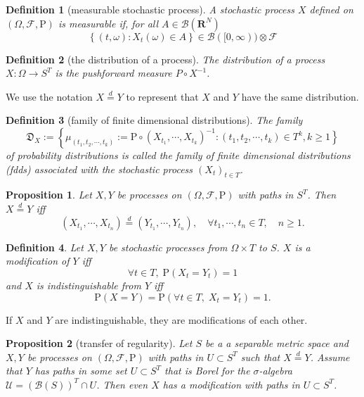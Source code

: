 \documentclass{report}
\newtheorem{definition}{Definition}[section]
\newtheorem{proposition}{Proposition}[section]
\theoremstyle{nonumberplain}
\begin{document}
\begin{definition}[measurable stochastic process]
	A stochastic process $X$ defined on $(\Omega ,{\mathcal{F}},\mathrm{P})$ is measurable if, for all $A \in \mathcal{B}\left(\mathbf{R}^{N}\right)$
	\[
	\left\{(t, \omega): X_{t}(\omega) \in A\right\} \in \mathcal{B}([0, \infty)) \otimes \mathcal{F}
	\]
\end{definition}
\begin{definition}[the distribution of a process]
	The distribution of a process $X: \Omega \rightarrow S^T$ is the pushforward measure $P\circ X^{-1}$.
\end{definition}
We use the notation $X \stackrel{d}{=} Y$ to represent that $X$ and $Y$ have the same distribution.

\begin{definition}[family of finite dimensional distributions]
	The family 
	$$\mathfrak{D}_X:=\left\{\mu_{(t_{1}, t_{2}, \cdots, t_{k})}:= \mathrm{P}\circ\left(X_{t_{1}}, \cdots, X_{t_{k}}\right)^{-1}:\right.\left.\left(t_{1}, t_{2}, \cdots, t_{k}\right) \in T^k,k\ge1\right\}$$ of probability distributions is called	the \emph{family of finite dimensional distributions (fdds) associated with the stochastic process $(X_{t})_{t\in T}$}.
\end{definition}

\begin{proposition}
	Let $X,Y$ be processes on $(\Omega ,{\mathcal{F}},\mathrm{P})$ with paths in $S^T$. Then $X \stackrel{d}{=} Y$ iff
	\[
	\left(X_{t_{1}}, \cdots, X_{t_{n}}\right) \stackrel{d}{=}\left(Y_{t_{1}}, \cdots, Y_{t_{n}}\right), \quad \forall t_{1}, \cdots, t_{n} \in T,\quad n\ge 1.
	\]
\end{proposition}

\begin{definition}
	Let $X, Y$ be stochastic processes from $\Omega\times T$ to $S$.
	$X$ is a \emph{modification} of $Y$ iff
	\[
	\forall t \in T,\; \mathrm{P}(X_t=Y_t)=1
	\]
	and $X$ is \emph{indistinguishable} from $Y$ iff
	\[
	\mathrm{P}(X=Y)=\mathrm{P}(\forall t \in T,\; X_t=Y_t)=1.
	\]
\end{definition}
If $X$ and $Y$ are indistinguishable, they are modifications of each other.

\begin{proposition}[transfer of regularity]
		Let $S$ be a a separable metric space and $X, Y$ be processes on $(\Omega ,{\mathcal{F}},\mathrm{P})$ with paths in $U \subset S^T$ such that $X \stackrel{d}{=} Y$. Assume that $Y$ has paths in some set $U \subset S^{T}$ that is Borel for the $\sigma$-algebra $\mathcal{U}=(\mathcal{B}(S))^{T}\cap U$. Then even $X$ has a modification with paths in $U \subset S^{T}$.
\end{proposition}
\end{document}
